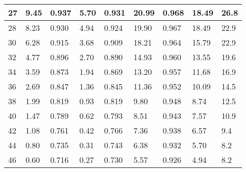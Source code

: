 \documentclass[thesis=M,czech]{FITthesis}[2016/06/26]
\begin{document}
\begin{table}[]
\begin{tabular}{|p{.3cm}|p{}|p{1cm}|p{}|p{}|p{0.95cm}|p{0.95cm}|p{1.45cm}|p{1.45cm}|}
27  & 9.45       & 0.937 & 5.70   & 0.931 & 20.99      & 0.968 & 18.49                                                                 & 26.8                                                                  \\ \hline
28  & 8.23       & 0.930 & 4.94   & 0.924 & 19.90      & 0.967 & 18.49                                                                 & 22.9                                                                  \\ \hline
30  & 6.28       & 0.915 & 3.68   & 0.909 & 18.21      & 0.964 & 15.79                                                                 & 22.9                                                                  \\ \hline
32  & 4.77       & 0.896 & 2.70   & 0.890 & 14.93      & 0.960 & 13.55                                                                 & 19.6                                                                  \\ \hline
34  & 3.59       & 0.873 & 1.94   & 0.869 & 13.20      & 0.957 & 11.68                                                                 & 16.9                                                                  \\ \hline
36  & 2.69       & 0.847 & 1.36   & 0.845 & 11.36      & 0.952 & 10.09                                                                 & 14.5                                                                  \\ \hline
38  & 1.99       & 0.819 & 0.93   & 0.819 & 9.80       & 0.948 & 8.74                                                                  & 12.5                                                                  \\ \hline
40  & 1.47       & 0.789 & 0.62   & 0.793 & 8.51       & 0.943 & 7.57                                                                  & 10.9                                                                  \\ \hline
42  & 1.08       & 0.761 & 0.42   & 0.766 & 7.36       & 0.938 & 6.57                                                                  & 9.4                                                                   \\ \hline
44  & 0.80       & 0.735 & 0.31   & 0.743 & 6.38       & 0.932 & 5.70                                                                  & 8.2                                                                   \\ \hline
46  & 0.60       & 0.716 & 0.27   & 0.730 & 5.57       & 0.926 & 4.94                                                                  & 8.2                                                                   \\ \hline

\end{tabular}
\end{table}
\end{document}
